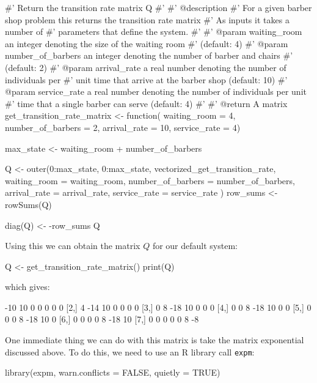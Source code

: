 \begin{Rin}
#' Return the transition rate matrix Q
#'
#' @description
#' For a given barber shop problem this returns the transition rate matrix
#' As inputs it takes a number of
#' parameters that define the system.
#'
#' @param waiting_room an integer denoting the size of the waiting room
#' (default: 4)
#' @param number_of_barbers an integer denoting the number of barber and chairs
#' (default: 2)
#' @param arrival_rate a real number denoting the number of individuals per
#' unit time that arrive at the barber shop (default: 10)
#' @param service_rate a real number denoting the number of individuals per unit
#' time that a single barber can serve (default: 4)
#'
#' @return A matrix
get_transition_rate_matrix <- function(
                                       waiting_room = 4,
                                       number_of_barbers = 2,
                                       arrival_rate = 10,
                                       service_rate = 4) {
  max_state <- waiting_room + number_of_barbers

  Q <- outer(0:max_state,
    0:max_state,
    vectorized_get_transition_rate,
    waiting_room = waiting_room,
    number_of_barbers = number_of_barbers,
    arrival_rate = arrival_rate,
    service_rate = service_rate
  )
  row_sums <- rowSums(Q)

  diag(Q) <- -row_sums
  Q
}
\end{Rin}

Using this we can obtain the matrix \(Q\) for our default system:

\begin{Rin}
Q <- get_transition_rate_matrix()
print(Q)
\end{Rin}

which gives:

\begin{Rout}
     [,1] [,2] [,3] [,4] [,5] [,6] [,7]
[1,]  -10   10    0    0    0    0    0
[2,]    4  -14   10    0    0    0    0
[3,]    0    8  -18   10    0    0    0
[4,]    0    0    8  -18   10    0    0
[5,]    0    0    0    8  -18   10    0
[6,]    0    0    0    0    8  -18   10
[7,]    0    0    0    0    0    8   -8
\end{Rout}

One immediate thing we can do with this matrix is take the matrix exponential
discussed above. To do this, we need to use an R library call
\texttt{expm}:

\begin{Rin}
library(expm, warn.conflicts = FALSE, quietly = TRUE)
\end{Rin}

